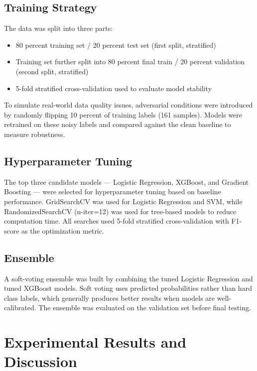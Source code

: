 \documentclass[11pt]{article}
\begin{document}
 \subsection{Training Strategy
} The data was split into three parts:
\begin{itemize}
    \item \textbf{} 80 percent training set / 20 percent test set (first split, stratified)
    \item \textbf{} Training set further split into 80 percent  final train / 20 percent validation (second split, stratified)
    \item \textbf{} 5-fold stratified cross-validation used to evaluate model stability

    \end{itemize}
To simulate real-world data quality issues, adversarial conditions were introduced by randomly flipping 10 percent of training labels (161 samples). Models were retrained on these noisy labels and compared against the clean baseline to measure robustness.

\subsection{Hyperparameter Tuning
} The top three candidate models — Logistic Regression, XGBoost, and Gradient Boosting — were selected for hyperparameter tuning based on baseline performance. GridSearchCV was used for Logistic Regression and SVM, while RandomizedSearchCV (n-iter=12) was used for tree-based models to reduce computation time. All searches used 5-fold stratified cross-validation with F1-score as the optimization metric.
\subsection{Ensemble} A soft-voting ensemble was built by combining the tuned Logistic Regression and tuned XGBoost models. Soft voting uses predicted probabilities rather than hard class labels, which generally produces better results when models are well-calibrated. The ensemble was evaluated on the validation set before final testing.


\section{Experimental Results and Discussion
}
\end{document}

